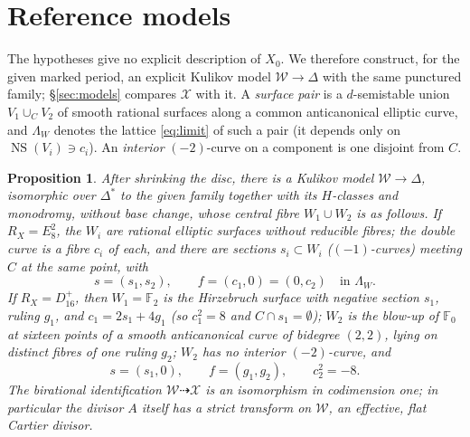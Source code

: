 \documentclass[11pt]{article}
\newcommand{\F}{\mathbb F}
\newcommand{\NS}{\operatorname{NS}}
\newcommand{\calX}{\mathcal X}
\newcommand{\calW}{\mathcal W}
\newtheorem{proposition}[theorem]{Proposition}
\theoremstyle{definition}
\theoremstyle{remark}
\begin{document}
\section{Reference models}\label{sec:reference}


The hypotheses give no explicit description of \(X_0\). We therefore
construct, for the given marked period, an explicit Kulikov model
\(\calW\to\Delta\) with the same punctured family; \S\ref{sec:models}
compares \(\calX\) with it. A \emph{surface pair} is a \(d\)-semistable union \(V_1\cup_CV_2\) of
smooth rational surfaces along a common anticanonical elliptic curve,
and \(\Lambda_W\) denotes the lattice \eqref{eq:limit} of such a pair
(it depends only on \(\NS(V_i)\ni c_i\)). An \emph{interior}
\((-2)\)-curve on a component is one disjoint from \(C\).

\begin{proposition}\label{prop:reference}
After shrinking the disc, there is a Kulikov model \(\calW\to\Delta\),
isomorphic over \(\Delta^*\) to the given family together with its
\(H\)-classes and monodromy, without base change, whose central fibre
\(W_1\cup W_2\) is as follows.
If \(R_X=E_8^2\), the \(W_i\) are rational elliptic surfaces
without reducible fibres; the double curve is a fibre \(c_i\) of each,
and there are sections \(s_i\subset W_i\) (\((-1)\)-curves) meeting
\(C\) at the same point, with
\begin{equation}\label{eq:Eref}
 s=(s_1,s_2),\qquad f=(c_1,0)=(0,c_2)\quad\text{in }\Lambda_W .
\end{equation}
If \(R_X=D_{16}^+\), then \(W_1=\F_2\) is the Hirzebruch
surface with negative section \(s_1\), ruling \(g_1\), and
\(c_1=2s_1+4g_1\) (so \(c_1^2=8\) and
\(C\cap s_1=\emptyset\)); \(W_2\) is the blow-up of \(\F_0\) at sixteen
points of a smooth anticanonical curve of bidegree \((2,2)\), lying on
distinct fibres of one ruling \(g_2\); \(W_2\) has no interior
\((-2)\)-curve, and
\begin{equation}\label{eq:Dref}
 s=(s_1,0),\qquad f=(g_1,g_2),\qquad c_2^2=-8 .
\end{equation}
The birational identification \(\calW\dashrightarrow\calX\) is an
isomorphism in codimension one; in particular the divisor \(A\)
itself has a strict transform on \(\calW\), an effective, flat Cartier
divisor.
\end{proposition}
\end{document}
